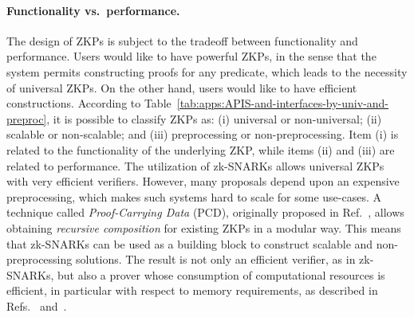 \paragraph{Functionality vs.\ performance.}
	The design of ZKPs is subject to the tradeoff between functionality and performance. 
	Users would like to have powerful ZKPs, in the sense that the system permits constructing %
proofs for any predicate, which %
leads to the necessity of universal ZKPs. 
	On the other hand, users would like to have efficient constructions. 
	According to Table~\ref{tab:apps:APIS-and-interfaces-by-univ-and-preproc}, it is possible to classify ZKPs as:
(i) universal or non-universal;
(ii) scalable or non-scalable; and 
(iii) preprocessing or non-preprocessing. 
	Item (i) is related to the functionality of the underlying %
ZKP, while items (ii) and (iii) are related to performance. 
	The utilization of zk-SNARKs allows %
universal ZKPs with very efficient verifiers. 
	However, many proposals %
depend upon an expensive preprocessing, which makes such systems hard to scale for some use-cases. 
	A technique called \textit{Proof-Carrying Data} (PCD), originally proposed in Ref.~\cite{2010:ICS:proof-carrying-data}, 
allows obtaining %
\textit{recursive composition} for existing ZKPs in a modular way. %
	This means that zk-SNARKs can be used as a building block to construct scalable and non-preprocessing solutions.
	The result is not only an efficient verifier, as in zk-SNARKs, but also a prover whose consumption of computational resources is efficient, in particular with respect to memory requirements, as described in Refs.~\cite{2017:Alg:Scalable-Zero-Knowledge-Via-Cycles-of-Elliptic-Curves} and~\cite{2013:Recursive-Composition-and-Bootstrapping-for-SNARKS-and-Proof-carrying-Data}.
\loosen






